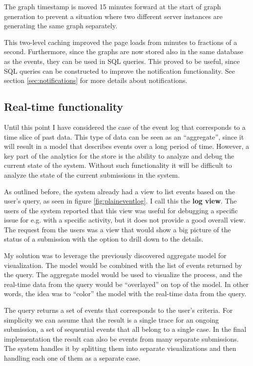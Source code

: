 The graph timestamp is moved 15 minutes forward at the start of graph generation to prevent a situation where two different server instances are generating the same graph separately.

This two-level caching improved the page loads from minutes to fractions of a second. Furthermore, since the graphs are now stored also in the same database as the events, they can be used in SQL queries. This proved to be useful, since SQL queries can be constructed to improve the notification functionality. See section \ref{sec:notifications} for more details about notifications.

\subsection{Real-time functionality}

Until this point I have considered the case of the event log that corresponds to a time slice of past data.
This type of data can be seen as an ``aggregate'', since it will result in a model that describes events over a long period of time.
However, a key part of the analytics for the store is the ability to analyze and debug the current state of the system.
Without such functionality it will be difficult to analyze the state of the current submissions in the system.

As outlined before, the system already had a view to list events based on the user's query, as seen in figure \ref{fig:plaineventlog}.
I call this the \textbf{log view}.
The users of the system reported that this view was useful for debugging a specific issue for e.g. with a specific activity, but it does not provide a good overall view.
The request from the users was a view that would show a big picture of the status of a submission with the option to drill down to the details.

My solution was to leverage the previously discovered aggregate model for visualization.
The model would be combined with the list of events returned by the query.
The aggregate model would be used to visualize the process, and the real-time data from the query would be ``overlayed'' on top of the model.
In other words, the idea was to ``color'' the model with the real-time data from the query.

The query returns a set of events that corresponds to the user's criteria.
For simplicity we can assume that the result is a single trace for an ongoing submission,
a set of sequential events that all belong to a single case.
In the final implementation the result can also be events from many separate submissions.
The system handles it by splitting them into separate visualizations and then handling each one of them as a separate case.

